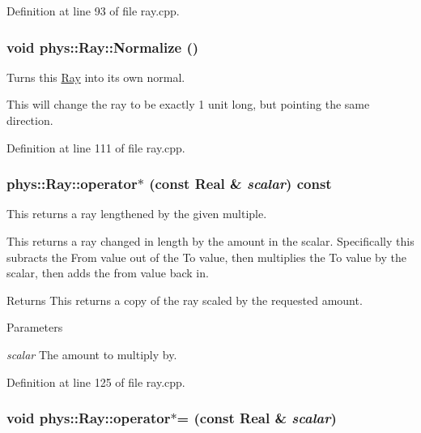 Definition at line 93 of file ray.cpp.

\hypertarget{classphys_1_1Ray_a2acbaef60718001a048db26ccaaef787}{
\subsubsection[{Normalize}]{\setlength{\rightskip}{0pt plus 5cm}void phys::Ray::Normalize ()}}
\label{df/d57/classphys_1_1Ray_a2acbaef60718001a048db26ccaaef787}


Turns this \hyperlink{classphys_1_1Ray}{Ray} into its own normal. 

This will change the ray to be exactly 1 unit long, but pointing the same direction. 

Definition at line 111 of file ray.cpp.

\hypertarget{classphys_1_1Ray_a6a47611776a9ab83d7ebc178a8d35b50}{
\subsubsection[{operator$\ast$}]{ phys::Ray::operator$\ast$ (const {\bf Real} \& {\em scalar}) const}}
\label{df/d57/classphys_1_1Ray_a6a47611776a9ab83d7ebc178a8d35b50}


This returns a ray lengthened by the given multiple. 

This returns a ray changed in length by the amount in the scalar. Specifically this subracts the From value out of the To value, then multiplies the To value by the scalar, then adds the from value back in. \begin{DoxyReturn}{Returns}
This returns a copy of the ray scaled by the requested amount. 
\end{DoxyReturn}

\begin{DoxyParams}{Parameters}
\item[{\em scalar}]The amount to multiply by. \end{DoxyParams}


Definition at line 125 of file ray.cpp.

\hypertarget{classphys_1_1Ray_acc1ac010f02f61b3d5234a5b619e926a}{
\subsubsection[{operator$\ast$=}]{\setlength{\rightskip}{0pt plus 5cm}void phys::Ray::operator$\ast$= (const {\bf Real} \& {\em scalar})}}
\label{df/d57/classphys_1_1Ray_acc1ac010f02f61b3d5234a5b619e926a}


